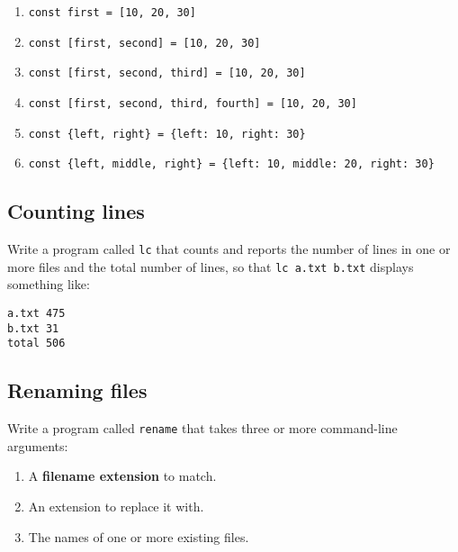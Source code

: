 \documentclass[krantzl]{krantz}
\newcommand{\glossref}[1]{\textbf{#1}}
\begin{document}
\begin{enumerate}

\item \texttt{const first = [10, 20, 30]}

\item \texttt{const [first, second] = [10, 20, 30]}

\item \texttt{const [first, second, third] = [10, 20, 30]}

\item \texttt{const [first, second, third, fourth] = [10, 20, 30]}

\item \texttt{const \{left, right\} = \{left: 10, right: 30\}}

\item \texttt{const \{left, middle, right\} = \{left: 10, middle: 20, right: 30\}}

\end{enumerate}

\subsection*{Counting lines}


Write a program called \texttt{lc} that counts and reports the number of lines in one or more files and the total number of lines,
so that \texttt{lc a.txt b.txt} displays something like:

\begin{lstlisting}[frame=tblr]
a.txt 475
b.txt 31
total 506
\end{lstlisting}

\subsection*{Renaming files}


Write a program called \texttt{rename} that takes three or more command-line arguments:

\begin{enumerate}

\item A \glossref{filename extension} to match.

\item An extension to replace it with.

\item The names of one or more existing files.

\end{enumerate}
\end{document}
